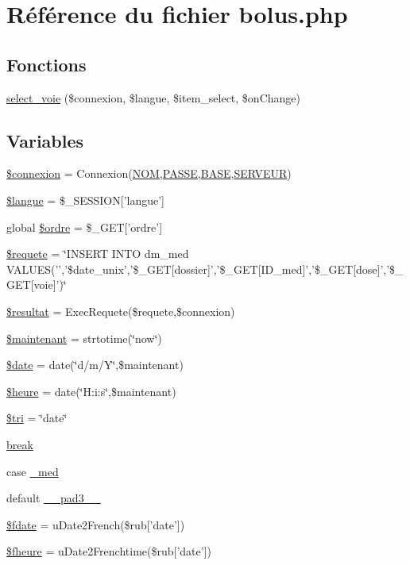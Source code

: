 \hypertarget{bolus_8php}{
\section{R\'{e}f\'{e}rence du fichier bolus.php}
\label{bolus_8php}
}
\subsection*{Fonctions}
\begin{CompactItemize}
\item 
\hyperlink{bolus_8php_a14}{select\_\-voie} (\$connexion, \$langue, \$item\_\-select, \$on\-Change)
\end{CompactItemize}
\subsection*{Variables}
\begin{CompactItemize}
\item 
\hyperlink{bolus_8php_a0}{\$connexion} = Connexion(\hyperlink{pma__connect_8php_a0}{NOM},\hyperlink{pma__connect_8php_a1}{PASSE},\hyperlink{pma__connect_8php_a3}{BASE},\hyperlink{pma__connect_8php_a2}{SERVEUR})
\item 
\hyperlink{bolus_8php_a1}{\$langue} = \$\_\-SESSION\mbox{[}'langue'\mbox{]}
\item 
global \hyperlink{bolus_8php_a2}{\$ordre} = \$\_\-GET\mbox{[}'ordre'\mbox{]}
\item 
\hyperlink{bolus_8php_a3}{\$requete} = \char`\"{}INSERT INTO dm\_\-med VALUES('','\$date\_\-unix','\$\_\-GET\mbox{[}dossier\mbox{]}','\$\_\-GET\mbox{[}ID\_\-med\mbox{]}','\$\_\-GET\mbox{[}dose\mbox{]}','\$\_\-GET\mbox{[}voie\mbox{]}')\char`\"{}
\item 
\hyperlink{bolus_8php_a4}{\$resultat} = Exec\-Requete(\$requete,\$connexion)
\item 
\hyperlink{bolus_8php_a5}{\$maintenant} = strtotime(\char`\"{}now\char`\"{})
\item 
\hyperlink{bolus_8php_a6}{\$date} = date(\char`\"{}d/m/Y\char`\"{},\$maintenant)
\item 
\hyperlink{bolus_8php_a7}{\$heure} = date(\char`\"{}H:i:s\char`\"{},\$maintenant)
\item 
\hyperlink{bolus_8php_a8}{\$tri} = \char`\"{}date\char`\"{}
\item 
\hyperlink{bolus_8php_a9}{break}
\item 
case \hyperlink{bolus_8php_a10}{\_\-med}
\item 
default \hyperlink{bolus_8php_a11}{\_\-\_\-pad3\_\-\_\-}
\item 
\hyperlink{bolus_8php_a12}{\$fdate} = u\-Date2French(\$rub\mbox{[}'date'\mbox{]})
\item 
\hyperlink{bolus_8php_a13}{\$fheure} = u\-Date2Frenchtime(\$rub\mbox{[}'date'\mbox{]})
\end{CompactItemize}


